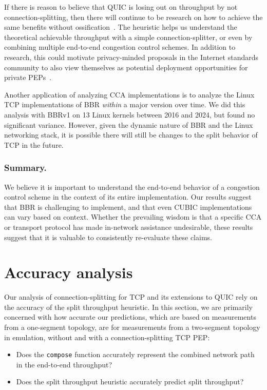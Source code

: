 If there is reason to believe
that QUIC is losing out on throughput by not connection-splitting, then there
will continue to be research on how to achieve the same benefits without
ossification~\cite{kosek2023secure,yuan2024sidekick,kramer2021masquepep,yuan2022sidecar}.
The heuristic helps us understand the theoretical achievable
throughput with a simple connection-splitter, or even by combining multiple
end-to-end congestion control schemes.
In addition to research, this could motivate privacy-minded proposals in the Internet
standards community to also view themselves as potential deployment opportunities
for private PEPs~\cite{kosek2021masque,sattler2022towards,rfc9297,rfc9298}.

Another application of analyzing CCA implementations is to analyze the Linux TCP
implementations of BBR \textit{within} a major version over time. We did
this analysis with BBRv1 on 13 Linux kernels between 2016 and 2024, but found
no significant variance. However, given the dynamic nature of BBR and the
Linux networking stack, it
is possible there will still be changes to the split behavior of TCP in the future.

\subsubsection{Summary.}

We believe it is important to understand the end-to-end behavior of a congestion
control scheme in the context of its entire implementation.
Our results suggest that BBR is challenging to implement, and that even CUBIC
implementations can vary based on context. Whether the prevailing wisdom is
that a specific CCA or transport protocol has made in-network assistance
undesirable, these results suggest that it is valuable to consistently
re-evaluate these claims.

\section{Accuracy analysis}
\label{sec:splitting:accuracy}



Our analysis of connection-splitting for TCP and its extensions to QUIC rely on
the accuracy of the split throughput heuristic. In this section, we are
primarily concerned with how accurate our predictions, which are based on
measurements from a one-segment topology, are for measurements from a
two-segment topology in emulation, without and with a connection-splitting TCP
PEP:
\begin{itemize}[noitemsep]
\item Does the \texttt{compose} function accurately represent the combined
 network path in the end-to-end throughput?
\item Does the split throughput heuristic accurately predict split throughput?
\end{itemize}

